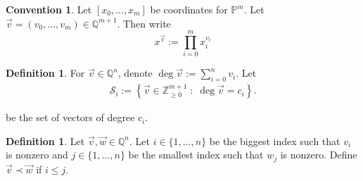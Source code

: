 \documentclass{amsart}
\theoremstyle{plain}
\theoremstyle{definition}
\newtheorem{defn}[thm]{Definition}
\newtheorem{convention}[thm]{Convention}
\theoremstyle{remark}
\numberwithin{equation}{section}
\newcommand\bq{{\mathbb Q}}
\newcommand\bp{{\mathbb P}}
\newcommand\bz{{\mathbb Z}}
\newcommand\mss{\mathscr{S}}
\begin{document}
\begin{convention}
Let $[x_0, \ldots, x_m]$ be coordinates for $\bp^m$. Let
$\vec{v} = (v_0, \ldots, v_m) \in \bq^{m + 1}$.   Then write
\[
	x^{\vec{v}} := \prod_{i = 0}^{m} x_i^{v_i}
\]
\end{convention}

\begin{defn}
\label{defn:vec-sum}
For $\vec{v} \in \bq^n$, denote $\deg \vec{v} := \sum_{i = 0}
^n v_i$.
Let 
\begin{align*}
	\mss_i := \left \{\vec{v} \in \bz_{\geq 0}^{m + 1} \; : \;
\deg \vec v = c_i \right\}.	
\end{align*}

\noindent
be the set of vectors of degree $c_i$.
\end{defn}

\begin{defn}
\label{defn:vec-order}
Let $\vec{v}, \vec{w} \in \bq^n$. Let $i \in \{1,\ldots, n\}$
be the biggest index such that $v_i$ is nonzero
and $j \in \{1,\ldots, n\}$ be the smallest index such that $w_j$ is
nonzero. Define $\vec{v} \prec \vec{w}$ if $i \leq j$.
\end{defn}
\end{document}
